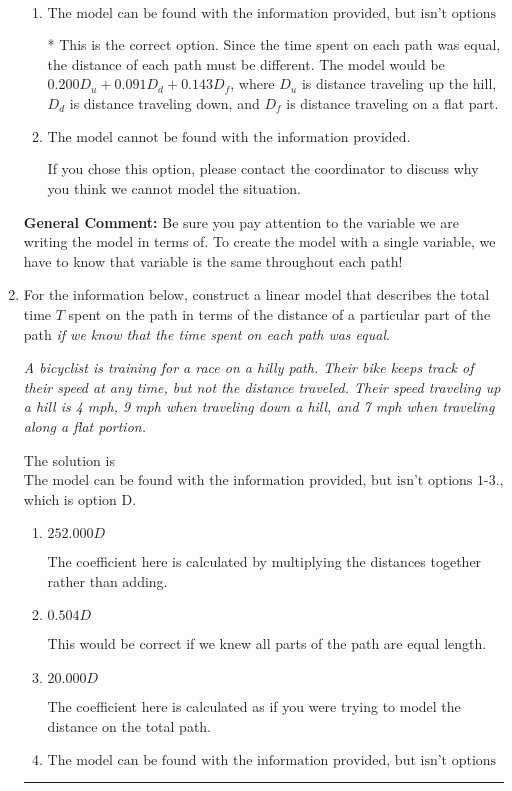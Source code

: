 \documentclass{extbook}[14pt]
\newcommand{\litem}[1]{\item #1

\rule{\textwidth}{0.4pt}}
\begin{document}
\begin{enumerate}
{\begin{enumerate}[label=\Alph*.]
The coefficient here is calculated by multiplying the distances together rather than adding.
\item \( \text{The model can be found with the information provided, but isn't options 1-3.} \)

* This is the correct option. Since the time spent on each path was equal, the distance of each path must be different. The model would be $0.200D_u + 0.091D_d + 0.143D_f$, where $D_u$ is distance traveling up the hill, $D_d$ is distance traveling down, and $D_f$ is distance traveling on a flat part.
\item \( \text{The model cannot be found with the information provided.} \)

If you chose this option, please contact the coordinator to discuss why you think we cannot model the situation.
\end{enumerate}

\textbf{General Comment:} Be sure you pay attention to the variable we are writing the model in terms of. To create the model with a single variable, we have to know that variable is the same throughout each path!
}
\litem{
For the information below, construct a linear model that describes the total time $T$ spent on the path in terms of the distance of a particular part of the path \textit{if we know that the time spent on each path was equal}.

\begin{center}
    \textit{ A bicyclist is training for a race on a hilly path. Their bike keeps track of their speed at any time, but not the distance traveled. Their speed traveling up a hill is 4 mph, 9 mph when traveling down a hill, and 7 mph when traveling along a flat portion. }
\end{center}
The solution is \( \text{The model can be found with the information provided, but isn't options 1-3.} \), which is option D.\begin{enumerate}[label=\Alph*.]
\item \( 252.000 D \)

The coefficient here is calculated by multiplying the distances together rather than adding.
\item \( 0.504 D \)

This would be correct if we knew all parts of the path are equal length.
\item \( 20.000 D \)

The coefficient here is calculated as if you were trying to model the distance on the total path.
\item \( \text{The model can be found with the information provided, but isn't options 1-3.} \)


\end{enumerate}}
\end{enumerate}
\end{document}
